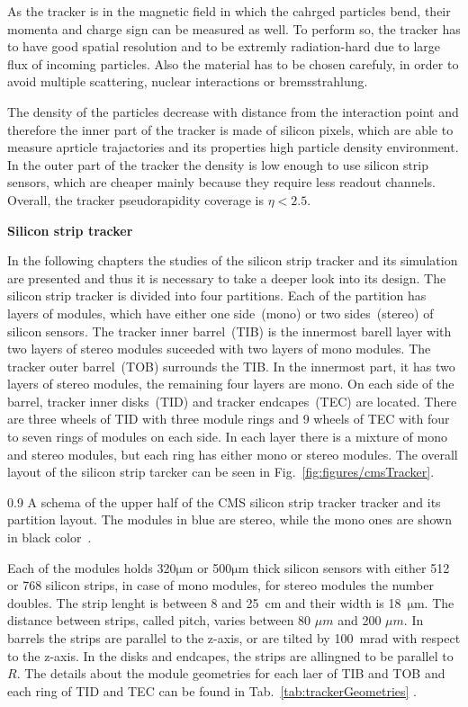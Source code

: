 As the tracker is in the magnetic field in which the cahrged particles bend, their momenta and charge sign can be measured as well. To perform so, the tracker has to have good spatial resolution and to be extremly radiation-hard due to large flux of incoming particles. Also the material has to be chosen carefuly, in order to avoid multiple scattering, nuclear interactions or bremsstrahlung.

The density of the particles decrease with distance from the interaction point and therefore the inner part of the tracker is made of silicon pixels, which are able to measure aprticle trajactories and its properties high particle density environment. In the outer part of the tracker the density is low enough to use silicon strip sensors, which are cheaper mainly because they require less readout channels. Overall, the tracker pseudorapidity coverage is  $\eta < 2.5$.

\textbf{Silicon strip tracker}

In the following chapters the studies of the silicon strip tracker and its simulation are presented and thus it is necessary to take a deeper look into its design. The silicon strip tracker is divided into four partitions. Each of the partition has layers of modules, which have either one side~(mono) or two sides~(stereo) of silicon sensors. The tracker inner barrel~(TIB) is the innermost barell layer with two layers of stereo modules suceeded with two layers of mono modules. The tracker outer barrel~(TOB) surrounds the TIB. In the innermost part, it has two layers of stereo modules, the remaining four layers are mono. On each side of the barrel, tracker inner disks~(TID) and tracker endcapes~(TEC) are located. There are three wheels of TID with three module rings and 9 wheels of TEC with four to seven rings of modules on each side. In each layer there is a mixture of mono and stereo modules, but each ring has either mono or stereo modules. The overall layout of the silicon strip tarcker can be seen in Fig.~\ref{fig:figures/cmsTracker}.

                 {0.9}       
                 {A schema of the upper half of the CMS silicon strip tracker tracker and its partition layout. The modules in blue are stereo, while the mono ones are shown in black color~\cite{Chatrchyan:2014fea}. }

Each of the modules holds 320$\mathrm{\mu m}$ or 500$\mathrm{\mu m}$ thick silicon sensors with either 512 or 768 silicon strips, in case of mono modules, for stereo modules the number doubles. The strip lenght is between 8 and 25~cm and their width is 18~$\mathrm{\mu m}$. The distance between strips, called pitch, varies between 80 $\mu m$ and 200 $\mu m$. In barrels the strips are parallel to the z-axis, or are tilted by 100~mrad with respect to the z-axis. In the disks and endcapes, the strips are allingned to be parallel to $R$. The details about the module geometries for each laer of TIB and TOB and each ring of TID and TEC can be found in Tab.~\ref{tab:trackerGeometries} .

